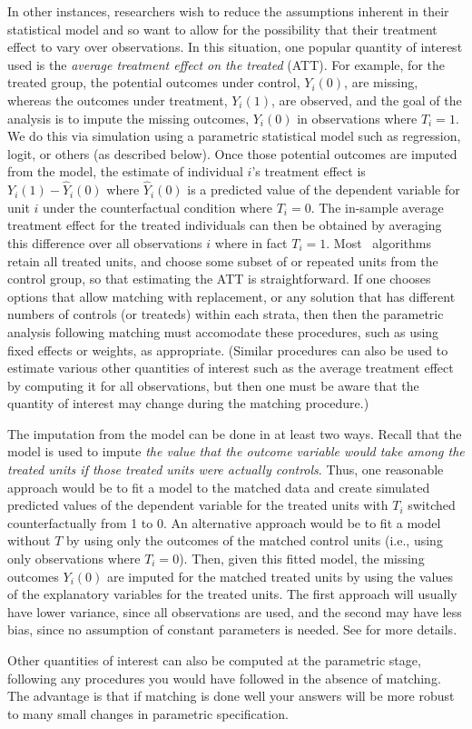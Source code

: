 In other instances, researchers wish to reduce the assumptions
inherent in their statistical model and so want to allow for the
possibility that their treatment effect to vary over observations.  In
this situation, one popular quantity of interest used is the
\emph{average treatment effect on the treated} (ATT).  For example,
for the treated group, the potential outcomes under control, $Y_i(0)$,
are missing, whereas the outcomes under treatment, $Y_i(1)$, are
observed, and the goal of the analysis is to impute the missing
outcomes, $Y_i(0)$ in observations where $T_i=1$.  We do this via
simulation using a parametric statistical model such as regression,
logit, or others (as described below).  Once those potential outcomes
are imputed from the model, the estimate of individual $i$'s treatment
effect is $Y_i(1)-\widehat{Y}_i(0)$ where $\widehat{Y}_i(0)$ is a
predicted value of the dependent variable for unit $i$ under the
counterfactual condition where $T_i=0$.  The in-sample average
treatment effect for the treated individuals can then be obtained by
averaging this difference over all observations $i$ where in fact
$T_i=1$.  Most \MatchIt\ algorithms retain all treated units, and
choose some subset of or repeated units from the control group, so
that estimating the ATT is straightforward.  If one chooses options
that allow matching with replacement, or any solution that has
different numbers of controls (or treateds) within each strata, then
then the parametric analysis following matching must accomodate these
procedures, such as using fixed effects or weights, as appropriate.
(Similar procedures can also be used to estimate various other
quantities of interest such as the average treatment effect by
computing it for all observations, but then one must be aware that the
quantity of interest may change during the matching procedure.)

The imputation from the model can be done in at least two ways.
Recall that the model is used to impute \emph{the value that the
  outcome variable would take among the treated units if those treated
  units were actually controls}.  Thus, one reasonable approach would
be to fit a model to the matched data and create simulated predicted
values of the dependent variable for the treated units with $T_i$
switched counterfactually from 1 to 0.  An alternative approach would
be to fit a model without $T$ by using only the outcomes of the
matched control units (i.e., using only observations where $T_i=0$).
Then, given this fitted model, the missing outcomes $Y_i(0)$ are
imputed for the matched treated units by using the values of the
explanatory variables for the treated units.  The first approach will
usually have lower variance, since all observations are used, and the
second may have less bias, since no assumption of constant parameters
is needed.  See \citet*{HoImaKin07} for more details.

Other quantities of interest can also be computed at the parametric
stage, following any procedures you would have followed in the absence
of matching.  The advantage is that if matching is done well your
answers will be more robust to many small changes in parametric
specification.


